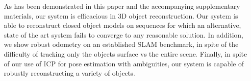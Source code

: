 As has been demonstrated in this paper and the accompanying supplementary materials, our system is efficacious in 3D object 
reconstruction. Our system is able to reconstruct closed object models on sequences for which an alternative, state of 
the art system \cite{Ren2013} fails to converge to any reasonable solution. In addition, we show robust odometry on an 
established SLAM benchmark, in spite of the difficulty of tracking only the objects surface vs the entire scene. Finally,
in spite of our use of ICP for pose estimation with ambiguities, our system is capable of robustly reconstructing a 
variety of objects.